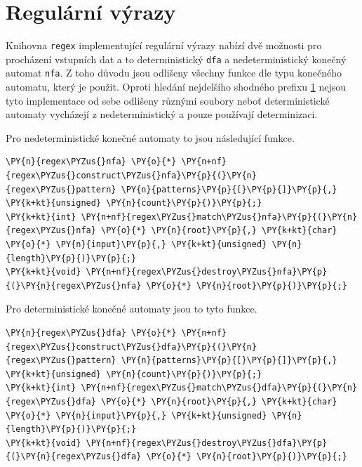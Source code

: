 \section{Regulární výrazy}
Knihovna \texttt{regex} implementující regulární výrazy nabízí dvě možnosti pro procházení
vstupních dat a to deterministický \texttt{dfa} a nedeterministický konečný automat \texttt{nfa}.
Z toho důvodu jsou odlišeny všechny funkce dle typu konečného automatu, který je použit.
Oproti hledání nejdelšího shodného prefixu \ref{} nejsou tyto implementace od sebe odlišeny
různými soubory neboť deterministické automaty vycházejí z nedeterministický a pouze používají
determinizaci.

Pro nedeterministické konečné automaty to jsou následující funkce.

\begin{Verbatim}[commandchars=\\\{\}]
\PY{n}{regex\PYZus{}nfa} \PY{o}{*} \PY{n+nf}{regex\PYZus{}construct\PYZus{}nfa}\PY{p}{(}\PY{n}{regex\PYZus{}pattern} \PY{n}{patterns}\PY{p}{[}\PY{p}{]}\PY{p}{,} \PY{k+kt}{unsigned} \PY{n}{count}\PY{p}{)}\PY{p}{;}
\PY{k+kt}{int} \PY{n+nf}{regex\PYZus{}match\PYZus{}nfa}\PY{p}{(}\PY{n}{regex\PYZus{}nfa} \PY{o}{*} \PY{n}{root}\PY{p}{,} \PY{k+kt}{char} \PY{o}{*} \PY{n}{input}\PY{p}{,} \PY{k+kt}{unsigned} \PY{n}{length}\PY{p}{)}\PY{p}{;}
\PY{k+kt}{void} \PY{n+nf}{regex\PYZus{}destroy\PYZus{}nfa}\PY{p}{(}\PY{n}{regex\PYZus{}nfa} \PY{o}{*} \PY{n}{root}\PY{p}{)}\PY{p}{;}
\end{Verbatim}

Pro deterministické konečné automaty jsou to tyto funkce.
\begin{Verbatim}[commandchars=\\\{\}]
\PY{n}{regex\PYZus{}dfa} \PY{o}{*} \PY{n+nf}{regex\PYZus{}construct\PYZus{}dfa}\PY{p}{(}\PY{n}{regex\PYZus{}pattern} \PY{n}{patterns}\PY{p}{[}\PY{p}{]}\PY{p}{,} \PY{k+kt}{unsigned} \PY{n}{count}\PY{p}{)}\PY{p}{;}
\PY{k+kt}{int} \PY{n+nf}{regex\PYZus{}match\PYZus{}dfa}\PY{p}{(}\PY{n}{regex\PYZus{}dfa} \PY{o}{*} \PY{n}{root}\PY{p}{,} \PY{k+kt}{char} \PY{o}{*} \PY{n}{input}\PY{p}{,} \PY{k+kt}{unsigned} \PY{n}{length}\PY{p}{)}\PY{p}{;}
\PY{k+kt}{void} \PY{n+nf}{regex\PYZus{}destroy\PYZus{}dfa}\PY{p}{(}\PY{n}{regex\PYZus{}dfa} \PY{o}{*} \PY{n}{root}\PY{p}{)}\PY{p}{;}
\end{Verbatim}

